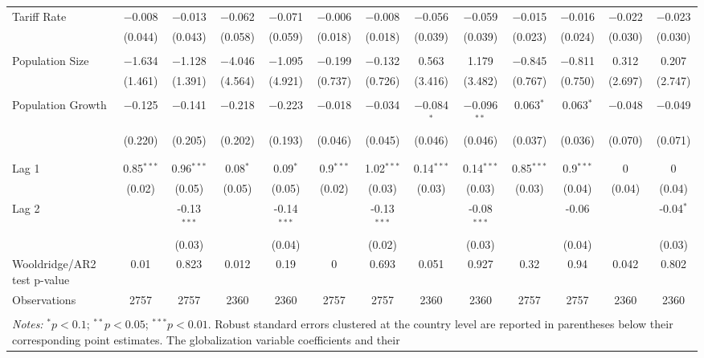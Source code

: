 \begin{table}
\begin{tabular}{@{\extracolsep{2pt}}lcccccccccccc}
 Tariff Rate & $-$0.008 & $-$0.013 & $-$0.062 & $-$0.071 & $-$0.006 & $-$0.008 & $-$0.056 & $-$0.059 & $-$0.015 & $-$0.016 & $-$0.022 & $-$0.023 \\ 
  & (0.044) & (0.043) & (0.058) & (0.059) & (0.018) & (0.018) & (0.039) & (0.039) & (0.023) & (0.024) & (0.030) & (0.030) \\ 
  & & & & & & & & & & & & \\ 
 Population Size & $-$1.634 & $-$1.128 & $-$4.046 & $-$1.095 & $-$0.199 & $-$0.132 & 0.563 & 1.179 & $-$0.845 & $-$0.811 & 0.312 & 0.207 \\ 
  & (1.461) & (1.391) & (4.564) & (4.921) & (0.737) & (0.726) & (3.416) & (3.482) & (0.767) & (0.750) & (2.697) & (2.747) \\ 
  & & & & & & & & & & & & \\ 
 Population Growth & $-$0.125 & $-$0.141 & $-$0.218 & $-$0.223 & $-$0.018 & $-$0.034 & $-$0.084$^{*}$ & $-$0.096$^{**}$ & 0.063$^{*}$ & 0.063$^{*}$ & $-$0.048 & $-$0.049 \\ 
  & (0.220) & (0.205) & (0.202) & (0.193) & (0.046) & (0.045) & (0.046) & (0.046) & (0.037) & (0.036) & (0.070) & (0.071) \\ 
  & & & & & & & & & & & & \\ 
\hline \\[-1.8ex] 
Lag 1 & 0.85$^{***}$ & 0.96$^{***}$ & 0.08$^{*}$ & 0.09$^{*}$ & 0.9$^{***}$ & 1.02$^{***}$ & 0.14$^{***}$ & 0.14$^{***}$ & 0.85$^{***}$ & 0.9$^{***}$ & 0 & 0 \\ 
 & (0.02) & (0.05) & (0.05) & (0.05) & (0.02) & (0.03) & (0.03) & (0.03) & (0.03) & (0.04) & (0.04) & (0.04) \\ 
Lag 2 &  & -0.13$^{***}$ &  & -0.14$^{***}$ &  & -0.13$^{***}$ &  & -0.08$^{***}$ &  & -0.06 &  & -0.04$^{*}$ \\ 
 &  & (0.03) &  & (0.04) &  & (0.02) &  & (0.03) &  & (0.04) &  & (0.03) \\ 
Wooldridge/AR2 test p-value & 0.01 & 0.823 & 0.012 & 0.19 & 0 & 0.693 & 0.051 & 0.927 & 0.32 & 0.94 & 0.042 & 0.802 \\ 
Observations & 2757 & 2757 & 2360 & 2360 & 2757 & 2757 & 2360 & 2360 & 2757 & 2757 & 2360 & 2360 \\ 
\hline 
\hline \\[-1.8ex] 
\multicolumn{13}{l}{\parbox{1.2\linewidth}{\textit{Notes:} $^{*}p<0.1$; $^{**}
            p<0.05$; $^{***} p<0.01$. Robust standard errors clustered at the
            country level are reported in parentheses below their corresponding
            point estimates. The globalization variable coefficients and their
}}
\end{tabular}
\end{table}
